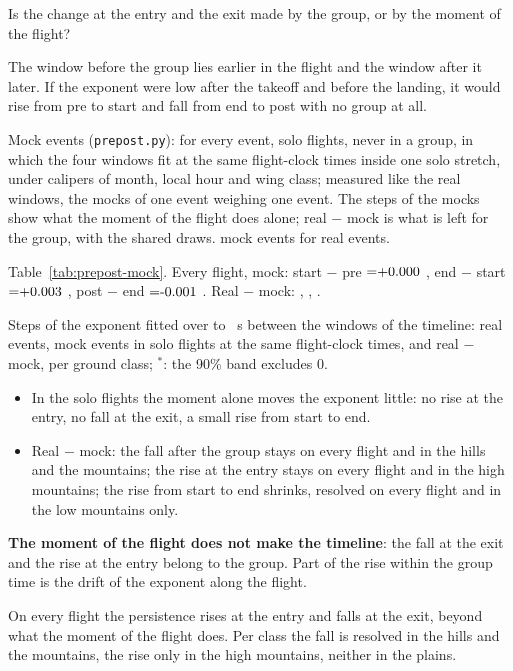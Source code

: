 \documentclass[10pt,a4paper]{article}
\newcommand{\Q}{\item[\textcolor{question}{\textbf{Q.}}]\color{question}}
\newcommand{\Res}{\item[\textcolor{answer}{\textbf{Result.}}]\color{black}}
\newcommand{\Home}{\item[\textcolor{answer}{\textbf{Take home.}}]\color{black}}
\newcommand{\Obs}{\item[\textcolor{answer}{\textbf{Observation.}}]\color{black}}
\newcommand{\Ded}{\item[\textcolor{answer}{\textbf{Deduction.}}]\color{black}}
\newcommand{\Why}{\item[\textcolor{black}{\textbf{Why.}}]\color{black}}
\newcommand{\Tool}{\item[\textcolor{black}{\textbf{Tool.}}]\color{black}}
\newenvironment{step}{\begin{description}[leftmargin=0pt, itemsep=7pt, topsep=8pt]}{\end{description}}
\begin{document}
\begin{step}
\Q Is the change at the entry and the exit made by the group, or by the moment of the flight?
\Why The window before the group lies earlier in the flight and the window after it later. If the exponent were
  low after the takeoff and before the landing, it would rise from pre to start and fall from end to post with no
  group at all.
\Tool Mock events (\texttt{prepost.py}): for every event, solo flights, never in a group, in which the four windows
  fit at the same flight-clock times inside one solo stretch, under calipers of month, local hour and wing class;
  measured like the real windows, the mocks of one event weighing one event. The steps of the mocks show what the
  moment of the flight does alone; real $-$ mock is what is left for the group, with the shared draws.
  \WhenMockEvents{} mock events for \WhenMockRealEvents{} real events.
\Res Table~\ref{tab:prepost-mock}. Every flight, mock: start $-$ pre $=\WhenMockAllStartMinusPre$
  \WhenMockAllStartMinusPreBand, end $-$ start $=\WhenMockAllEndMinusStart$ \WhenMockAllEndMinusStartBand, post $-$
  end $=\WhenMockAllPostMinusEnd$ \WhenMockAllPostMinusEndBand. Real $-$ mock: \WhenRealMinusMockAllStartMinusPre{}
  \WhenRealMinusMockAllStartMinusPreBand, \WhenRealMinusMockAllEndMinusStart{}
  \WhenRealMinusMockAllEndMinusStartBand, \WhenRealMinusMockAllPostMinusEnd{}
  \WhenRealMinusMockAllPostMinusEndBand.
  \begin{table}[H]
  \centering
  \resizebox{\textwidth}{!}{}
  \caption{Steps of the exponent fitted over \WhenLongLo{} to \WhenLongHi~s between the windows of the timeline: real
  events, mock events in solo flights at the same flight-clock times, and real $-$ mock, per ground class;
  $^*$: the 90\% band excludes 0.}
  \label{tab:prepost-mock}
  \end{table}
\Obs\mbox{}
  \begin{itemize}
  \item In the solo flights the moment alone moves the exponent little: no rise at the entry, no fall at the exit,
    a small rise from start to end.
  \item Real $-$ mock: the fall after the group stays on every flight and in the hills and the mountains; the rise
    at the entry stays on every flight and in the high mountains; the rise from start to end shrinks, resolved on
    every flight and in the low mountains only.
  \end{itemize}
\Ded \textbf{The moment of the flight does not make the timeline}: the fall at the exit and the rise at the entry
  belong to the group. Part of the rise within the group time is the drift of the exponent along the flight.
\Home On every flight the persistence rises at the entry and falls at the exit, beyond what the moment of the flight
  does. Per class the fall is resolved in the hills and the mountains, the rise only in the high mountains, neither
  in the plains.
\end{step}
\end{document}
